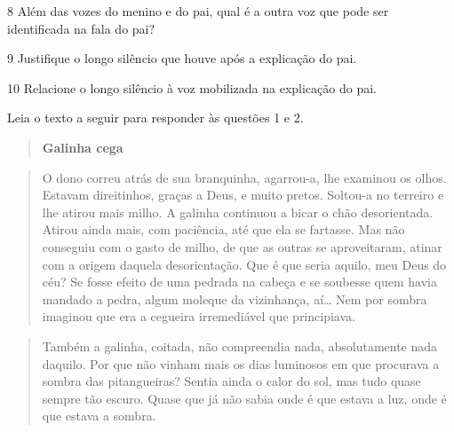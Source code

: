 \num{8} Além das vozes do menino e do pai, qual é a outra voz que pode
ser identificada na fala do pai?


\num{9} Justifique o longo silêncio que houve após a explicação do pai.


\num{10} Relacione o longo silêncio à voz mobilizada na explicação do
pai.



Leia o texto a seguir para responder às questões 1 e 2.

\begin{quote}
\textbf{Galinha cega}
\end{quote}

\begin{quote}
O dono correu atrás de sua branquinha, agarrou-a, lhe examinou os olhos.
Estavam direitinhos, graças a Deus, e muito pretos. Soltou-a no terreiro
e lhe atirou mais milho. A galinha continuou a bicar o chão
desorientada. Atirou ainda mais, com paciência, até que ela se fartasse.
Mas não conseguiu com o gasto de milho, de que as outras se
aproveitaram, atinar com a origem daquela desorientação. Que é que seria
aquilo, meu Deus do céu? Se fosse efeito de uma pedrada na cabeça e se
soubesse quem havia mandado a pedra, algum moleque da vizinhança,
aí\ldots{} Nem por sombra imaginou que era a cegueira irremediável que
principiava.
\end{quote}

\begin{quote}
Também a galinha, coitada, não compreendia nada, absolutamente nada
daquilo. Por que não vinham mais os dias luminosos em que procurava a
sombra das pitangueiras? Sentia ainda o calor do sol, mas tudo quase
sempre tão escuro. Quase que já não sabia onde é que estava a luz, onde
é que estava a sombra.
\end{quote}

